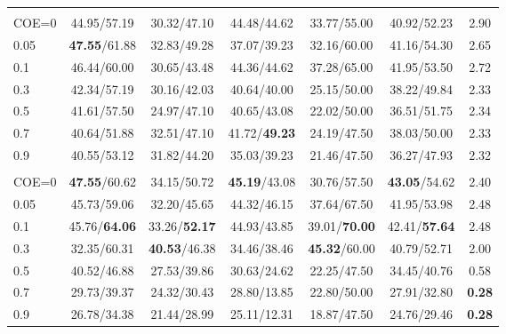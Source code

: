\begin{table}[t]
\begin{tabular}{@{}lcccccc@{}}
\rowcolor{gray!15}
\multicolumn{7}{@{}l@{}}{\textbf{\textbf{BudgetMem-\textsc{Rea}} (COE)}} \\
COE=0   & 44.95/57.19 & 30.32/47.10 & 44.48/44.62 & 33.77/55.00 & 40.92/52.23 & 2.90 \\
0.05    & \textbf{47.55}/61.88 & 32.83/49.28 & 37.07/39.23 & 32.16/60.00 & 41.16/54.30 & 2.65 \\
0.1     & 46.44/60.00 & 30.65/43.48 & 44.36/44.62 & 37.28/65.00 & 41.95/53.50 & 2.72 \\
0.3     & 42.34/57.19 & 30.16/42.03 & 40.64/40.00 & 25.15/50.00 & 38.22/49.84 & 2.33 \\
0.5     & 41.61/57.50 & 24.97/47.10 & 40.65/43.08 & 22.02/50.00 & 36.51/51.75 & 2.34 \\
0.7     & 40.64/51.88 & 32.51/47.10 & 41.72/\textbf{49.23} & 24.19/47.50 & 38.03/50.00 & 2.33 \\
0.9     & 40.55/53.12 & 31.82/44.20 & 35.03/39.23 & 21.46/47.50 & 36.27/47.93 & 2.32 \\
\midrule

\rowcolor{gray!15}
\multicolumn{7}{@{}l@{}}{\textbf{\textbf{BudgetMem-\textsc{Cap}} (COE)}} \\
COE=0   & \textbf{47.55}/60.62 & 34.15/50.72 & \textbf{45.19}/43.08 & 30.76/57.50 & \textbf{43.05}/54.62 & 2.40 \\
0.05    & 45.73/59.06 & 32.20/45.65 & 44.32/46.15 & 37.64/67.50 & 41.95/53.98 & 2.48 \\
0.1     & 45.76/\textbf{64.06} & 33.26/\textbf{52.17} & 44.93/43.85 & 39.01/\textbf{70.00} & 42.41/\textbf{57.64} & 2.48 \\
0.3     & 32.35/60.31 & \textbf{40.53}/46.38 & 34.46/38.46 & \textbf{45.32}/60.00 & 40.79/52.71 & 2.00 \\
0.5     & 40.52/46.88 & 27.53/39.86 & 30.63/24.62 & 22.25/47.50 & 34.45/40.76 & 0.58 \\
0.7     & 29.73/39.37 & 24.32/30.43 & 28.80/13.85 & 22.80/50.00 & 27.91/32.80 & \textbf{0.28} \\
0.9     & 26.78/34.38 & 21.44/28.99 & 25.11/12.31 & 18.87/47.50 & 24.76/29.46 & \textbf{0.28} \\
\bottomrule
\end{tabular}
\end{table}